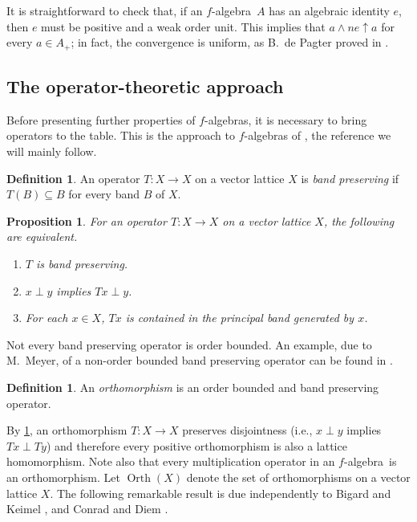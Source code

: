 \documentclass{memo-l}
\newtheorem{prop}[theorem]{Proposition}
\theoremstyle{definition}
\newtheorem{defn}[theorem]{Definition}
\theoremstyle{remark}
\numberwithin{section}{chapter}
\numberwithin{equation}{chapter}
\newcommand{\falg}{$f\!$-algebra}
\newcommand{\orth}[1]{\operatorname{Orth}(#1)}
\begin{document}
It is straightforward to check that, if an \falg\ $A$ has an algebraic identity $e$, then $e$ must be positive and a weak order unit. This implies that $a \wedge ne \uparrow a$ for
every $a \in A_+$; in fact, the convergence is uniform, as B.\ de Pagter
proved in \cite[Lemma 10.6]{depagter1981}.

\subsection{The operator-theoretic approach}

Before presenting further properties of \falg s, it is necessary to
bring operators to the table. This is the approach to \falg s of
\cite[Section 2.3]{aliprantis_burkinshaw2006}, the reference we will
mainly follow.

\begin{defn}
    An operator $T\colon X\to X$ on a vector lattice $X$ is \emph{band
    preserving} if $T(B)\subseteq B$ for every band $B$ of $X$.
\end{defn}

\begin{prop}\label{prop:band_preserving}
    For an operator $T\colon X\to X$ on a vector lattice $X$, the
    following are equivalent.
    \begin{enumerate}
        \item $T$ is band preserving.
        \item $x \perp y$ implies $Tx \perp y$.
        \item For each $x \in X$, $Tx$ is contained in the principal
            band generated by $x$.
    \end{enumerate}
\end{prop}

Not every band preserving operator is order bounded. An example, due
to M.\ Meyer, of
a non-order bounded band preserving operator can be
found in \cite[Example 2.38]{aliprantis_burkinshaw2006}.

\begin{defn}
    An \emph{orthomorphism} is an order bounded and band preserving
    operator.
\end{defn}

By \cref{prop:band_preserving}, an orthomorphism $T\colon X\to X$
preserves disjointness (i.e., $x\perp y$ implies $Tx \perp Ty$) and
therefore every positive orthomorphism is also a lattice homomorphism.
Note also that every multiplication operator in an \falg\ is an
orthomorphism. Let $\orth X$ denote the set of orthomorphisms on a vector
lattice $X$. The following remarkable result is due independently to
Bigard and Keimel \cite{bigard_keimel1969}, and Conrad and Diem
\cite{conrad_diem1971}.
\end{document}
